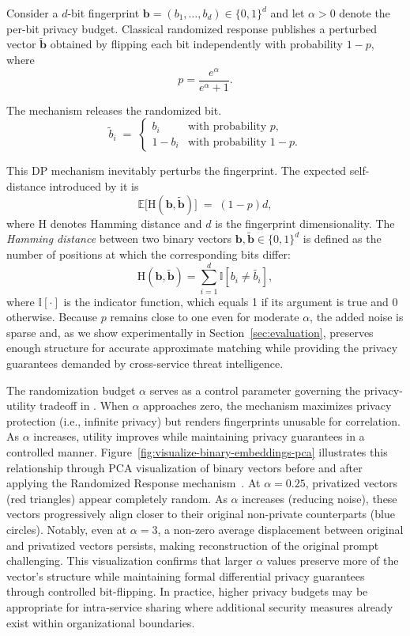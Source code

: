 %
Consider a $d$-bit fingerprint $\mathbf{b}=(b_1,\dots,b_d)\!\in\!\{0,1\}^d$ and let $\alpha\!>\!0$ denote the per-bit privacy budget.
Classical randomized response publishes a perturbed vector $\tilde{\mathbf{b}}$ obtained by flipping each bit independently with probability $1-p$, where
\[
    p = \frac{e^{\alpha}}{e^{\alpha}+1} .
\]

The mechanism releases the randomized bit.
\[
    \tilde{b}_i \;=\;
    \begin{cases}
        b_i   & \text{with probability } p,    \\[6pt]
        1-b_i & \text{with probability } 1-p .
    \end{cases}
\]

This DP mechanism inevitably perturbs the fingerprint. The expected self-distance introduced by it is
\[
    \mathbb{E}\bigl[\mathrm{H}(\mathbf{b},\mathbf{\tilde{b}})\bigr] \;=\; (1-p)d,
\]
where $\mathrm{H}$ denotes Hamming distance and $d$ is the fingerprint dimensionality. The \emph{Hamming distance} between two binary vectors $\mathbf{b}, \mathbf{\tilde{b}} \in \{0,1\}^d$ is defined as the number of positions at which the corresponding bits differ:
\[
    \mathrm{H}(\mathbf{b}, \mathbf{\tilde{b}}) = \sum_{i=1}^d \mathbb{I}[b_i \ne  \tilde{b_i}] ,
\]
where $\mathbb{I}[\cdot]$ is the indicator function, which equals 1 if its argument is true and 0 otherwise.
Because $p$ remains close to one even for moderate $\alpha$, the added noise is sparse and, as we show experimentally in Section~\ref{sec:evaluation}, preserves enough structure for accurate approximate matching while providing the privacy guarantees demanded by cross-service threat intelligence.


The randomization budget $\alpha$ serves as a control parameter governing the privacy-utility tradeoff in \tool. 
When $\alpha$ approaches zero, the mechanism maximizes privacy protection (i.e., infinite privacy) but renders fingerprints unusable for correlation. 
As $\alpha$ increases, utility improves while maintaining privacy guarantees in a controlled manner.
Figure~\ref{fig:visualize-binary-embeddings-pca} illustrates this relationship through PCA visualization of binary vectors before and after applying the Randomized Response mechanism~\cite{warner1965randomized}. 
At $\alpha = 0.25$, privatized vectors (red triangles) appear completely random. 
As $\alpha$ increases (reducing noise), these vectors progressively align closer to their original non-private counterparts (blue circles). 
Notably, even at $\alpha = 3$, a non-zero average displacement between original and privatized vectors persists, making reconstruction of the original prompt challenging. 
This visualization confirms that larger $\alpha$ values preserve more of the vector's structure while maintaining formal differential privacy guarantees through controlled bit-flipping. 
In practice, higher privacy budgets may be appropriate for intra-service sharing where additional security measures already exist within organizational boundaries.



